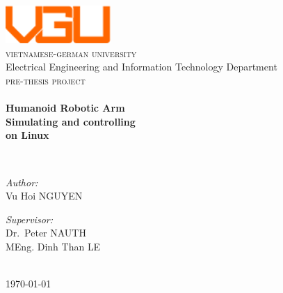 \begin{titlepage}
\begin{center}

\includegraphics[width=0.3\textwidth]{./image/vgu_logo}~\\[1cm]
\textsc{\LARGE vietnamese-german university}~\\[0.2cm]
Electrical Engineering and Information Technology Department ~\\[3cm]
\textsc{\Large pre-thesis project}\\[0.5cm]

\HRule \\[0.4cm]
{ \huge \bfseries Humanoid Robotic Arm \\ Simulating and controlling \\on Linux \\[0.5cm] }

\HRule \\[3cm]

\noindent
\begin{minipage}[t]{0.4\textwidth}
\begin{flushleft} \large
\emph{Author:}\\
Vu Hoi \textsc{NGUYEN}
\end{flushleft}
\end{minipage}%
\begin{minipage}[t]{0.4\textwidth}
\begin{flushright} \large
\emph{Supervisor:} \\
Dr.~Peter \textsc{NAUTH} \\
MEng. Dinh Than \textsc{LE}
\end{flushright}
\end{minipage}
\vfill

~\\[1cm]
{\large \today}

\end{center}


\end{titlepage}
